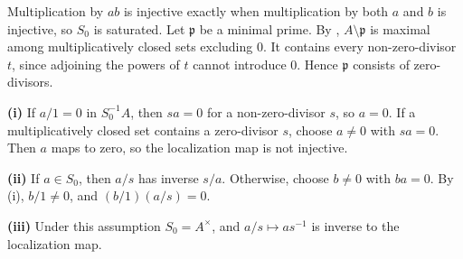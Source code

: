 Multiplication by $ab$ is injective exactly when multiplication by both $a$ and $b$ is injective, so $S_0$ is saturated. Let $\mathfrak p$ be a minimal prime. By , $A\setminus\mathfrak p$ is maximal among multiplicatively closed sets excluding $0$. It contains every non-zero-divisor $t$, since adjoining the powers of $t$ cannot introduce $0$. Hence $\mathfrak p$ consists of zero-divisors.

\textbf{(i)} If $a/1=0$ in $S_0^{-1}A$, then $sa=0$ for a non-zero-divisor $s$, so $a=0$. If a multiplicatively closed set contains a zero-divisor $s$, choose $a\ne0$ with $sa=0$. Then $a$ maps to zero, so the localization map is not injective.

\textbf{(ii)} If $a\in S_0$, then $a/s$ has inverse $s/a$. Otherwise, choose $b\ne0$ with $ba=0$. By (i), $b/1\ne0$, and $(b/1)(a/s)=0$.

\textbf{(iii)} Under this assumption $S_0=A^\times$, and $a/s\mapsto as^{-1}$ is inverse to the localization map.
